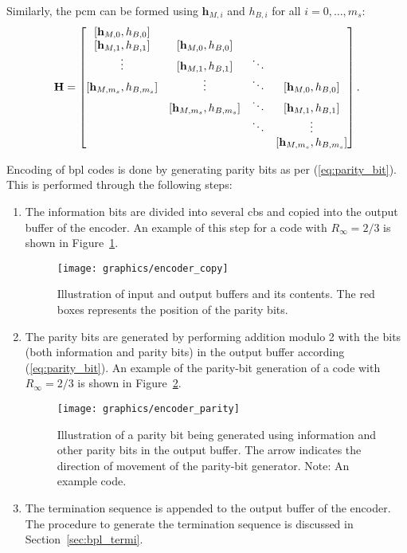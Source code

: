 Similarly, the \gls{pcm} can be formed using $\mathbf{h}_{M,i}$ and $h_{B,i}$ for all $i=0,\dots,m_s$:
\begin{align}\label{eq:bpl_pcm}
\mathbf{H}=
\begin{bmatrix}
[\mathbf{h}_{M,0},h_{B,0}]\\
[\mathbf{h}_{M,1},h_{B,1}] &[\mathbf{h}_{M,0},h_{B,0}]\\
\vdots &[\mathbf{h}_{M,1},h_{B,1}] &\ddots\\
[\mathbf{h}_{M,m_s},h_{B,m_s}] &\vdots &\ddots &[\mathbf{h}_{M,0},h_{B,0}]\\
&[\mathbf{h}_{M,m_s},h_{B,m_s}] &\ddots &[\mathbf{h}_{M,1},h_{B,1}]\\
& &\ddots &\vdots\\
& & &[\mathbf{h}_{M,m_s},h_{B,m_s}]
\end{bmatrix}.
\end{align}

Encoding of \gls{bpl} codes is done by generating parity bits as per (\ref{eq:parity_bit}). This is performed through the following steps:
\begin{enumerate}
  \item The information bits are divided into several \glspl{cb} and copied into the output buffer of the encoder. An example of this step for a code with $R_\infty=2/3$ is shown in Figure~\ref{fig:encode_copy}.
  \begin{figure}[htbp]
    \centering
    \texttt{[image: graphics/encoder\_copy]}
    \caption[Illustration of input and output buffers of encoder.]{Illustration of input and output buffers and its contents. The red boxes represents the position of the parity bits.}
    \label{fig:encode_copy}
  \end{figure}
  \item The parity bits are generated by performing addition modulo 2 with the bits (both information and parity bits) in the output buffer according (\ref{eq:parity_bit}). An example of the parity-bit generation of a code with  $R_\infty=2/3$ is shown in Figure~\ref{fig:encoder_paritygen}.
   \begin{figure}[htbp]
    \centering
    \texttt{[image: graphics/encoder\_parity]}
    \caption[Illustration of a parity bit being generation.]{Illustration of a parity bit being generated using information and other parity bits in the output buffer. The arrow indicates the direction of movement of the parity-bit generator. Note: An example code.}
    \label{fig:encoder_paritygen}
  \end{figure}
  \item The termination sequence is appended to the output buffer of the encoder. The procedure to generate the termination sequence is discussed in Section~\ref{sec:bpl_termi}.
\end{enumerate}

